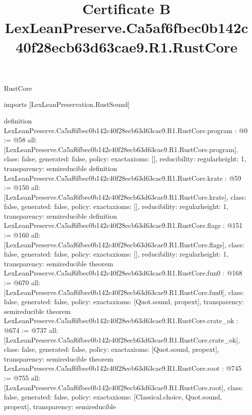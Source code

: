 \begin{lexlean}{RustCore}
\title{Certificate B LexLeanPreserve.Ca5af6fbec0b142c40f28ecb63d63cae9.R1.RustCore}
\begin{coremodule}
imports [LexLeanPreservation.RustSound]

definition LexLeanPreserve.Ca5af6fbec0b142c40f28ecb63d63cae9.R1.RustCore.program : @0 := @58 {
  all: [LexLeanPreserve.Ca5af6fbec0b142c40f28ecb63d63cae9.R1.RustCore.program],
  class: false,
  generated: false,
  policy: exact{axioms: []},
  reducibility: regular{height: 1},
  transparency: semireducible
}
definition LexLeanPreserve.Ca5af6fbec0b142c40f28ecb63d63cae9.R1.RustCore.krate : @59 := @150 {
  all: [LexLeanPreserve.Ca5af6fbec0b142c40f28ecb63d63cae9.R1.RustCore.krate],
  class: false,
  generated: false,
  policy: exact{axioms: []},
  reducibility: regular{height: 1},
  transparency: semireducible
}
definition LexLeanPreserve.Ca5af6fbec0b142c40f28ecb63d63cae9.R1.RustCore.flags : @151 := @160 {
  all: [LexLeanPreserve.Ca5af6fbec0b142c40f28ecb63d63cae9.R1.RustCore.flags],
  class: false,
  generated: false,
  policy: exact{axioms: []},
  reducibility: regular{height: 1},
  transparency: semireducible
}
theorem LexLeanPreserve.Ca5af6fbec0b142c40f28ecb63d63cae9.R1.RustCore.fun0 : @168 := @670 {
  all: [LexLeanPreserve.Ca5af6fbec0b142c40f28ecb63d63cae9.R1.RustCore.fun0],
  class: false,
  generated: false,
  policy: exact{axioms: [Quot.sound, propext]},
  transparency: semireducible
}
theorem LexLeanPreserve.Ca5af6fbec0b142c40f28ecb63d63cae9.R1.RustCore.crate_ok : @674 := @737 {
  all: [LexLeanPreserve.Ca5af6fbec0b142c40f28ecb63d63cae9.R1.RustCore.crate_ok],
  class: false,
  generated: false,
  policy: exact{axioms: [Quot.sound, propext]},
  transparency: semireducible
}
theorem LexLeanPreserve.Ca5af6fbec0b142c40f28ecb63d63cae9.R1.RustCore.root : @745 := @755 {
  all: [LexLeanPreserve.Ca5af6fbec0b142c40f28ecb63d63cae9.R1.RustCore.root],
  class: false,
  generated: false,
  policy: exact{axioms: [Classical.choice, Quot.sound, propext]},
  transparency: semireducible
}


\end{coremodule}
\end{lexlean}

